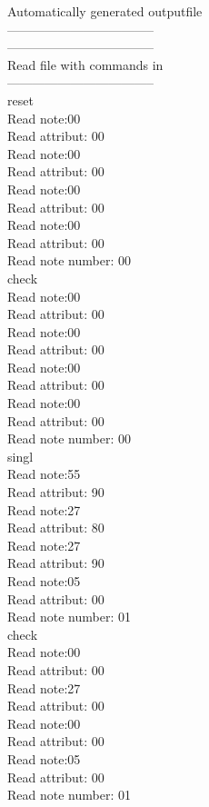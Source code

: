 Automatically generated outputfile\\
-----------------------------------\\
-----------------------------------\\


Read file with commands in\\
-----------------------------------\\
reset\\
Read note:00\\
Read attribut: 00\\
Read note:00\\
Read attribut: 00\\
Read note:00\\
Read attribut: 00\\
Read note:00\\
Read attribut: 00\\
Read note number: 00\\

check\\
Read note:00\\
Read attribut: 00\\
Read note:00\\
Read attribut: 00\\
Read note:00\\
Read attribut: 00\\
Read note:00\\
Read attribut: 00\\
Read note number: 00\\

singl\\
Read note:55\\
Read attribut: 90\\
Read note:27\\
Read attribut: 80\\
Read note:27\\
Read attribut: 90\\
Read note:05\\
Read attribut: 00\\
Read note number: 01\\

check\\
Read note:00\\
Read attribut: 00\\
Read note:27\\
Read attribut: 00\\
Read note:00\\
Read attribut: 00\\
Read note:05\\
Read attribut: 00\\
Read note number: 01\\

